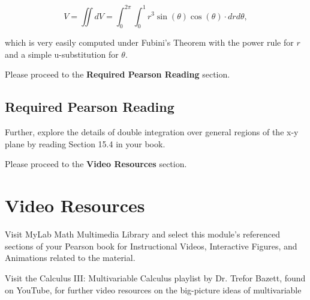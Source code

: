 \documentclass{ximera}
\begin{document}
$$V=\iint dV=\int_0^{2\pi}\int_0^1r^3\sin(\theta)\cos(\theta)\cdot drd\theta,$$

which is very easily computed under Fubini's Theorem with the power rule for $r$ and a simple u-substitution for $\theta$.

Please proceed to the \textbf{Required Pearson Reading} section.

\subsection{Required Pearson Reading}

Further, explore the details of double integration over general regions of the x-y plane by reading Section 15.4 in your book.

Please proceed to the \textbf{Video Resources} section.

\section{Video Resources}

Visit MyLab Math Multimedia Library and select this module's referenced sections of your Pearson book for Instructional Videos, Interactive Figures, and Animations related to the material.

Visit the Calculus III: Multivariable Calculus playlist by Dr. Trefor Bazett, found on YouTube, for further video resources on the big-picture ideas of multivariable
\end{document}
